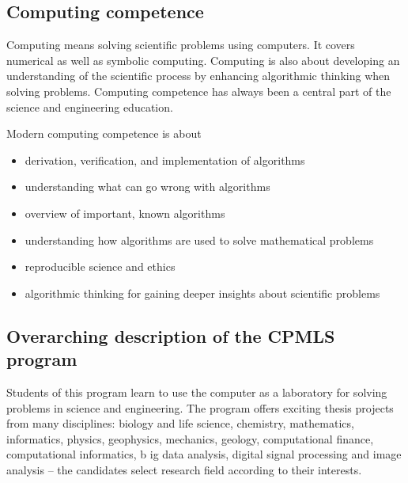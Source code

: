 \documentclass[%
oneside,                 %
final,                   %
10pt]{article}
\begin{document}
\subsection{Computing competence}
\begin{block}{}
Computing means solving scientific problems using computers. It covers
numerical as well as symbolic computing. Computing is also about
developing an understanding of the scientific process by enhancing
algorithmic thinking when solving problems.  Computing competence has
always been a central part of the science and engineering
education.

Modern computing competence is about

\begin{itemize}
\item derivation, verification, and implementation of algorithms

\item understanding what can go wrong with algorithms

\item overview of important, known algorithms

\item understanding how algorithms are used to solve mathematical problems

\item reproducible science and ethics

\item algorithmic thinking for gaining deeper insights about scientific problems
\end{itemize}

\noindent
\end{block}


\subsection{Overarching description of the CPMLS program}
\begin{block}{}
Students of this program learn to use the computer as a laboratory for
solving problems in science and engineering. The program offers
exciting thesis projects from many disciplines: biology and life
science, chemistry, mathematics, informatics, physics, geophysics,
mechanics, geology, computational finance, computational informatics, b
ig data analysis, digital signal processing
and image analysis – the candidates select research field according to
their interests.
\end{block}
\end{document}
